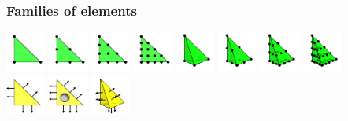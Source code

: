 \begin{frame}
  \frametitle{Families of elements}

  \includegraphics[width=1.3cm]{png/CG1_2d.png}
  \includegraphics[width=1.3cm]{png/CG2_2d.png}
  \includegraphics[width=1.3cm]{png/CG3_2d.png}
  \includegraphics[width=1.3cm]{png/CG4_2d.png}
  \includegraphics[width=1.3cm]{png/CG1_3d.png}
  \includegraphics[width=1.3cm]{png/CG2_3d.png}
  \includegraphics[width=1.3cm]{png/CG3_3d.png}
  \includegraphics[width=1.3cm]{png/CG4_3d.png} \\
  \includegraphics[width=1.3cm]{png/BDM1_2d.png}
  \includegraphics[width=1.3cm]{png/BDM2_2d.png}
  \includegraphics[width=1.3cm]{png/BDM1_3d.png}

\end{frame}
